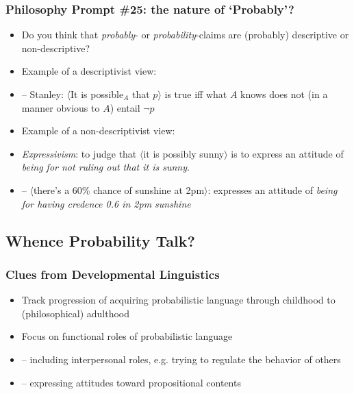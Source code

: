 \begin{frame}
\frametitle{Philosophy Prompt \#25: the nature of `Probably'?}

\begin{itemize}[<+->]

\item Do you think that \textit{probably}- or \textit{probability}-claims are (probably) descriptive or non-descriptive?

\item Example of a descriptivist view:
\item[] -- Stanley: $\langle$It is possible$_A$ that $p$$\rangle$ is true iff what $A$ knows does not (in a manner obvious to $A$) entail $\neg p$

\item Example of a non-descriptivist view:
\item[] \emph{Expressivism}: to judge that $\langle$it is possibly sunny$\rangle$ is to express an attitude of \textit{being for not ruling out that it is sunny}. 
\item[] -- $\langle$there's a 60\% chance of sunshine at 2pm$\rangle$: expresses an attitude of \textit{being for having credence 0.6 in 2pm sunshine}


\end{itemize}
\end{frame}



\subsection{Whence Probability Talk?}

\begin{frame}
\frametitle{Clues from Developmental Linguistics}

\begin{itemize}[<+->]

\item Track progression of acquiring probabilistic language through childhood to (philosophical) adulthood

\item Focus on functional roles of probabilistic language

\item[] -- including interpersonal roles, e.g. trying to regulate the behavior of others

\item[] -- expressing attitudes toward propositional contents


\end{itemize}
\end{frame}

